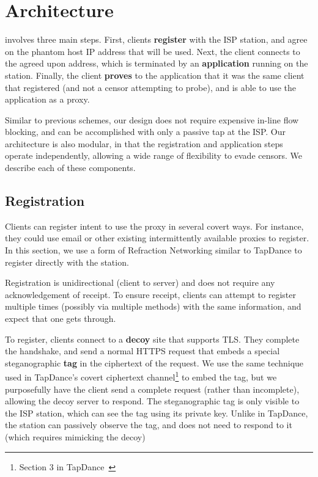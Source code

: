\documentclass[letterpaper,twocolumn,10pt]{article}
\begin{document}


\section{Architecture}
\label{sec:architecture}

\scheme involves three main steps. First, clients \textbf{register} with the
ISP station,
and agree on the phantom host IP address that will be used. Next, the client
connects to the agreed upon address, which is terminated by an
\textbf{application} running on the station. Finally, the client \textbf{proves}
to the application that it was the same client that registered (and not a censor
attempting to probe), and is able to use the application as a proxy.

Similar to previous schemes, our design does not require expensive in-line
flow blocking, and can be accomplished with only a passive tap at the ISP.
Our architecture is also modular, in that the registration and application steps operate
independently, allowing a wide range of flexibility to evade censors. We
describe each of these components.

\subsection{Registration}

Clients can register intent to use the proxy in several covert ways. For
instance, they could use email or other existing intermittently available proxies
to register. In this section, we use a form of Refraction Networking similar to
TapDance to register directly with the station.

Registration is unidirectional (client to server) and does not require any
acknowledgement of receipt. To ensure receipt, clients can attempt to register
multiple times (possibly via multiple methods) with the same information, and expect
that one gets through.

\medskip

To register, clients connect to a \textbf{decoy} site that supports TLS. They
complete the handshake, and send a normal HTTPS request that embeds a special
steganographic \textbf{tag} in the ciphertext of the request. We use
the same technique used in TapDance's covert ciphertext channel\footnote{Section 3 in
TapDance~\cite{tapdance14}} to embed the tag, but we purposefully have the client
send a complete request (rather than incomplete), allowing the decoy server to respond.
The steganographic tag is only visible to the ISP station, which can see the tag using its
private key. Unlike in TapDance, the \scheme station can passively observe
the tag, and does not need to respond to it (which requires mimicking the
decoy)
\end{document}
